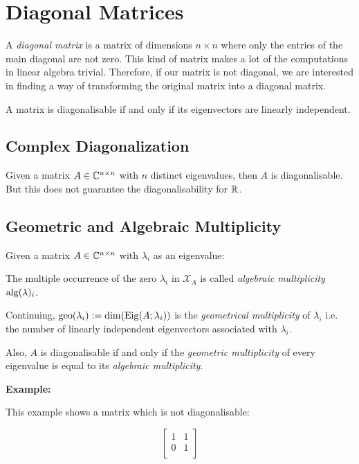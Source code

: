 \section{Diagonal Matrices}

A \emph{diagonal matrix} is a matrix of dimensions \(n \times n\) where only the entries of the main diagonal 
are not zero. This kind of matrix makes a lot of the computations in linear algebra trivial. Therefore, 
if our matrix is not diagonal, we are interested in finding a way of transforming the original matrix 
into a diagonal matrix.

A matrix is diagonalisable if and only if its eigenvectors are linearly independent.

\subsection{Complex Diagonalization}

Given a matrix \(A \in \mathbb{C}^{n \times n}\) with \(n\) distinct eigenvalues, then \(A\) is
diagonalisable. But this does not guarantee the diagonalisability for \(\mathbb{R}\).

\subsection{Geometric and Algebraic Multiplicity}

Given a matrix \(A \in \mathbb{C}^{n \times n}\) with \(\lambda_i\) as an eigenvalue: 

The multiple occurrence of the zero \(\lambda_i\) in \(\mathcal{X}_A\) is called \emph{algebraic multiplicity} \(\mathrm{alg}(\lambda)_i\). 

Continuing, \(\mathrm{geo}(\lambda_i):= \dim(\mathrm{Eig}(A;\lambda_i))\) is the \emph{geometrical multiplicity} of \(\lambda_i\) i.e. the number 
of linearly independent eigenvectors associated with \(\lambda_i\).

Also, \(A\) is diagonalisable if and only if the \emph{geometric multiplicity} of every eigenvalue is equal 
to its \emph{algebraic multiplicity}.

\textbf{Example:}

This example shows a matrix which is not diagonalisable:

\[
    \begin{bmatrix}
        1 & 1 \\
        0 & 1 \\
    \end{bmatrix}
\]

